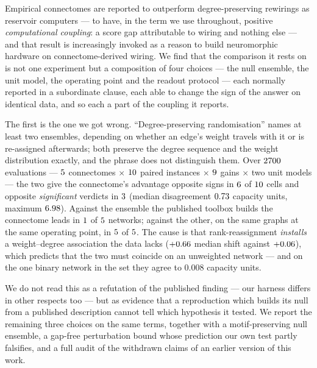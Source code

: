 Empirical connectomes are reported to outperform degree-preserving rewirings as reservoir
computers --- to have, in the term we use throughout, positive \emph{computational
coupling}: a score gap attributable to wiring and nothing else --- and that result is
increasingly invoked as a reason to build neuromorphic hardware on connectome-derived
wiring. We find that the comparison it rests on is not one experiment but a composition of
four choices --- the null ensemble, the unit model, the operating point and the readout
protocol --- each normally reported in a subordinate clause, each able to change the sign
of the answer on identical data, and so each a part of the coupling it reports.

The first is the one we got wrong. ``Degree-preserving randomisation'' names at least two
ensembles, depending on whether an edge's weight travels with it or is re-assigned
afterwards; both preserve the degree sequence and the weight distribution exactly, and the
phrase does not distinguish them. Over $2700$
evaluations --- $5$ connectomes $\times$ $10$ paired instances
$\times$ $9$ gains $\times$ two unit models --- the two give the connectome's
advantage opposite signs in $6$ of $10$ cells and opposite
\emph{significant} verdicts in $3$ (median disagreement
$0.73$ capacity units, maximum $6.98$). Against the ensemble
the published toolbox builds the connectome leads in $1$ of
$5$ networks; against the other, on the same graphs at the same operating
point, in $5$ of $5$. The cause is that rank-reassignment
\emph{installs} a weight--degree association the data lacks ($+0.66$ median shift
against $+0.06$), which predicts that the two must coincide on an unweighted
network --- and on the one binary network in the set they agree to $0.008$ capacity units.

We do not read this as a refutation of the published finding --- our harness differs in
other respects too --- but as evidence that a reproduction which builds its null from a
published description cannot tell which hypothesis it tested. We
report the remaining three choices on the same terms, together with a motif-preserving
null ensemble, a gap-free perturbation bound whose prediction our own test partly
falsifies, and a full audit of the withdrawn claims of an earlier version of this work.
